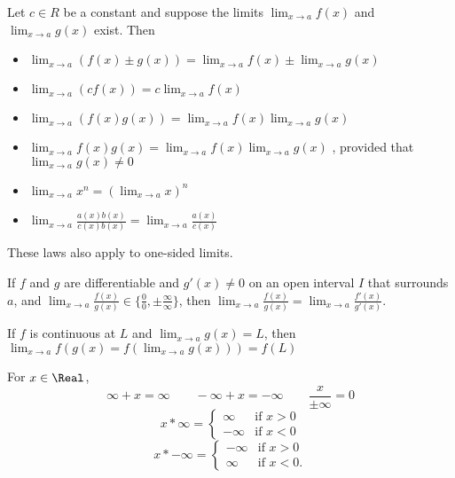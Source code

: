 
\begin{theorem}
  Let $c \in R$ be a constant and suppose the limits $\lim_{x \to a} f (x)$ and $\lim_{x \to a} g (x)$ exist. Then
  \begin{itemize}
  \item $\displaystyle\lim_{x \to a}( f (x) \pm g(x)) = \lim_{x \to a} f (x) \pm \lim_{x \to a} g(x)$
  \item $\displaystyle\lim_{x \to a}(c f (x)) = c \lim_{x \to a} f (x)$
  \item $\displaystyle\lim_{x \to a}( f (x)g(x)) = \lim_{x \to a} f (x) \lim_{x \to a} g(x)$
  \item $\displaystyle\lim_{x \to a} f (x) g(x) = \lim_{x \to a} f (x) \lim_{x \to a} g(x)$ , provided that $\displaystyle\lim_{x \to a} g(x) \neq 0$
  \item $\displaystyle\lim_{x \to a} x^n = (\lim_{x \to a} x)^n$
  \item $\displaystyle\lim_{x \to a} \frac{a(x)b(x)}{c(x)b(x)} = \lim_{x \to a} \frac{a(x)}{c(x)}$
  \end{itemize}
  These laws also apply to one-sided limits.
\end{theorem}

\begin{theorem}
  If $f$ and $g$ are differentiable and $g'(x) \neq 0$ on an open interval $I$ that surrounds $a$, and $\displaystyle\lim_{x \to a}\frac{f(x)}{g(x)} \in \{\frac{0}{0}, \pm\frac{\infty}{\infty}\}$, then $\displaystyle\lim_{x \to a}\frac{f(x)}{g(x)} = \lim_{x \to a}\frac{f'(x)}{g'(x)}$.
\end{theorem}

\begin{theorem}
  If $f$ is continuous at $L$ and $\displaystyle\lim_{x \to a}g(x) = L$, then $\displaystyle\lim_{x \to a} f(g(x) = f(\lim_{x \to a} g(x))) = f(L)$
\end{theorem}

\begin{theorem}
  For $x \in \Real$,
  \[
    \infty + x = \infty \qquad
    -\infty + x = -\infty \qquad
    \frac{x}{\pm\infty} = 0 
  \]\[
    x * \infty = \begin{cases}
      \infty & \text{if } x > 0 \\
      -\infty & \text{if } x < 0
    \end{cases}
  \]\[
    x * -\infty = \begin{cases}
      -\infty & \text{if } x > 0 \\
      \infty & \text{if } x < 0.
    \end{cases}
  \]
\end{theorem}

